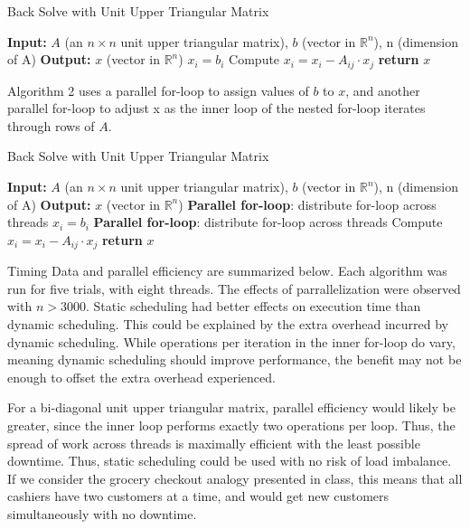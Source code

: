 \documentclass{article}
\begin{document}
\begin{algorithm}
\caption{Back Solve with Unit Upper Triangular Matrix}
\begin{algorithmic}
\State \textbf{Input:} $A$ (an $n \times n$ unit upper triangular matrix), $b$ (vector in $\mathbb{R}^n$), n (dimension of A)
\State \textbf{Output:} $x$ (vector in $\mathbb{R}^n$)
    \State $x_i = b_i$
\EndFor
{}
        \State Compute $x_i = x_i - A_{ij} \cdot x_j$
    \EndFor
\EndFor
\State \textbf{return} $x$
\end{algorithmic}
\end{algorithm}
\FloatBarrier 
Algorithm 2 uses a parallel for-loop to assign values of $b$ to $x$, and another parallel for-loop to adjust x as the inner loop of the nested for-loop iterates through rows of $A$.
\begin{algorithm}
\caption{Back Solve with Unit Upper Triangular Matrix}
\begin{algorithmic}
\State \textbf{Input:} $A$ (an $n \times n$ unit upper triangular matrix), $b$ (vector in $\mathbb{R}^n$), n (dimension of A)
\State \textbf{Output:} $x$ (vector in $\mathbb{R}^n$)
\State \textbf{Parallel for-loop}: distribute for-loop across threads
    \State $x_i = b_i$
\EndFor
{}
    \State \textbf{Parallel for-loop}: distribute for-loop across threads
        \State Compute $x_i = x_i - A_{ij} \cdot x_j$
    \EndFor
\EndFor
\State \textbf{return} $x$
\end{algorithmic}
\end{algorithm}
\FloatBarrier
Timing Data and parallel efficiency are summarized below. Each algorithm was run for five trials, with eight threads. The effects of parrallelization were observed with $n > 3000$. Static scheduling had better effects on execution time than dynamic scheduling. This could be explained by the extra overhead incurred by dynamic scheduling. While operations per iteration in the inner for-loop do vary, meaning dynamic scheduling should improve performance, the benefit may not be enough to offset the extra overhead experienced. 

For a bi-diagonal unit upper triangular matrix, parallel efficiency would likely be greater, since the inner loop performs exactly two operations per loop. Thus, the spread of work across threads is maximally efficient with the least possible downtime. Thus, static scheduling could be used with no risk of load imbalance. If we consider the grocery checkout analogy presented in class, this means that all cashiers have two customers at a time, and would get new customers simultaneously with no downtime.
\end{document}
